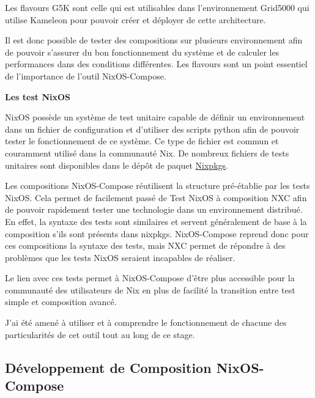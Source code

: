 \documentclass[a4paper,french,12pt, titlepage]{article}
\begin{document}
Les flavours G5K sont celle qui est utilisables dans l'environnement
Grid5000 qui utilise Kameleon pour pouvoir créer et déployer de cette
architecture.\newline

Il est donc possible de tester des compositions sur plusieurs
environnement afin de pouvoir s'assurer du bon fonctionnement du système
et de calculer les performances dans des conditions différentes. Les
flavours sont un point essentiel de l'importance de l'outil
NixOS-Compose.\newline

\textbf{Les test NixOS}\newline

NixOS possède un système de test unitaire capable de définir un
environnement dans un fichier de configuration et d'utiliser des scripts
python afin de pouvoir tester le fonctionnement de ce système. Ce type
de fichier est commun et couramment utilisé dans la communauté Nix. De
nombreux fichiers de tests unitaires sont disponibles dans le dépôt de
paquet
\href{https://github.com/NixOS/nixpkgs/tree/master/nixos/tests}{Nixpkgs}.\newline

Les compositions NixOS-Compose réutilisent la structure pré-établie par
les tests NixOS. Cela permet de facilement passé de Test NixOS à
composition NXC afin de pouvoir rapidement tester une technologie dans
un environnement distribué. En effet, la syntaxe des tests sont
similaires et servent généralement de base à la composition s'ils sont
présents dans nixpkgs. NixOS-Compose reprend donc pour ces compositions
la syntaxe des tests, mais NXC permet de répondre à des problèmes que
les tests NixOS seraient incapables de réaliser.\newline

Le lien avec ces tests permet à NixOS-Compose d'être plus accessible
pour la communauté des utilisateurs de Nix en plus de facilité la
transition entre test simple et composition avancé.\newline

J'ai été amené à utiliser et à comprendre le fonctionnement de chacune
des particularités de cet outil tout au long de ce stage.\newline

\newpage

\hypertarget{duxe9veloppement-de-composition-nixos-compose}{%
\subsection{Développement de Composition
NixOS-Compose}\label{duxe9veloppement-de-composition-nixos-compose}}
\end{document}
